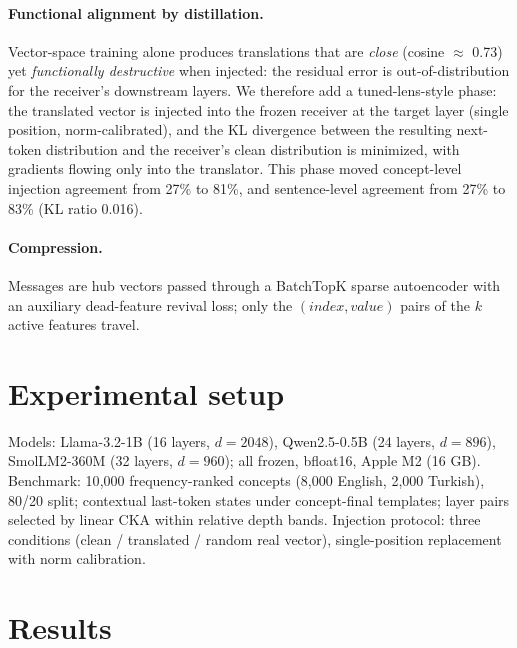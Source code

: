 \documentclass[11pt]{article}
\begin{document}
\paragraph{Functional alignment by distillation.} Vector-space training
alone produces translations that are \emph{close} (cosine $\approx$ 0.73)
yet \emph{functionally destructive} when injected: the residual error is
out-of-distribution for the receiver's downstream layers. We therefore add a
tuned-lens-style phase: the translated vector is injected into the frozen
receiver at the target layer (single position, norm-calibrated), and the KL
divergence between the resulting next-token distribution and the receiver's
clean distribution is minimized, with gradients flowing only into the
translator. This phase moved concept-level injection agreement from 27\% to
81\%, and sentence-level agreement from 27\% to 83\% (KL ratio 0.016).

\paragraph{Compression.} Messages are hub vectors passed through a BatchTopK
sparse autoencoder with an auxiliary dead-feature revival loss; only the
$(index, value)$ pairs of the $k$ active features travel.

\section{Experimental setup}
Models: Llama-3.2-1B (16 layers, $d=2048$), Qwen2.5-0.5B (24 layers,
$d=896$), SmolLM2-360M (32 layers, $d=960$); all frozen, bfloat16, Apple M2
(16 GB). Benchmark: 10{,}000 frequency-ranked concepts (8{,}000 English,
2{,}000 Turkish), 80/20 split; contextual last-token states under
concept-final templates; layer pairs selected by linear CKA within relative
depth bands. Injection protocol: three conditions (clean / translated /
random real vector), single-position replacement with norm calibration.

\section{Results}
\end{document}
